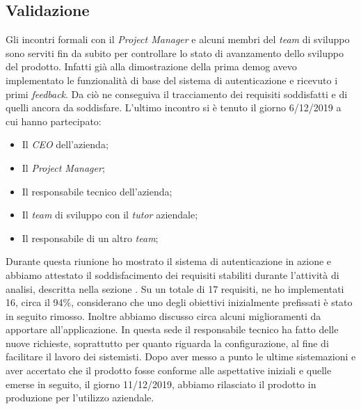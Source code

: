 \subsection{Validazione}
Gli incontri formali con il \textit{Project Manager} e alcuni membri del \textit{team} di sviluppo sono serviti fin da subito per controllare lo stato di avanzamento dello sviluppo del prodotto. Infatti già alla dimostrazione della prima \gls{demog} avevo implementato le funzionalità di base del sistema di autenticazione e ricevuto i primi \textit{feedback}. Da ciò ne conseguiva il tracciamento dei requisiti soddisfatti e di quelli ancora da soddisfare.
L'ultimo incontro si è tenuto il giorno 6/12/2019 a cui hanno partecipato:
    \begin{itemize}
            \item Il \textit{CEO} dell'azienda;
            \item Il \textit{Project Manager};
            \item Il responsabile tecnico dell'azienda;
            \item Il \textit{team} di sviluppo con il \textit{tutor} aziendale;
            \item Il responsabile di un altro \textit{team};
    \end{itemize}
Durante questa riunione ho mostrato il sistema di autenticazione in azione e abbiamo attestato il soddisfacimento dei requisiti stabiliti durante l'attività di analisi, descritta nella sezione . Su un totale di 17 requisiti, ne ho implementati 16, circa il 94\%, considerano che uno degli obiettivi inizialmente prefissati è stato in seguito rimosso.
Inoltre abbiamo discusso circa alcuni miglioramenti da apportare all'applicazione. In questa sede il responsabile tecnico ha fatto delle nuove richieste, soprattutto per quanto riguarda la configurazione, al fine di facilitare il lavoro dei sistemisti. Dopo aver messo a punto le ultime sistemazioni e aver accertato che il prodotto fosse conforme alle aspettative iniziali e quelle emerse in seguito, il giorno 11/12/2019, abbiamo rilasciato il prodotto in produzione per l'utilizzo aziendale. \\